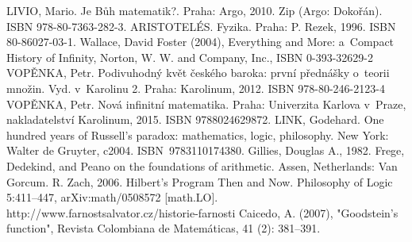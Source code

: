 \documentclass[czech]{article}
\begin{document}
\begin{thebibliography}{}

    LIVIO, Mario. Je Bůh matematik?. Praha: Argo, 2010. Zip (Argo: Dokořán). ISBN 978-80-7363-282-3.
    ARISTOTELÉS. Fyzika. Praha: P. Rezek, 1996. ISBN 80-86027-03-1.
    Wallace, David Foster (2004), Everything and More: a~Compact History of Infinity, Norton, W. W. and Company, Inc., ISBN 0-393-32629-2
    VOPĚNKA, Petr. Podivuhodný květ českého baroka: první přednášky o~teorii množin. Vyd. v~Karolinu 2. Praha: Karolinum, 2012. ISBN 978-80-246-2123-4
    VOPĚNKA, Petr. Nová infinitní matematika. Praha: Univerzita Karlova v~Praze, nakladatelství Karolinum, 2015. ISBN 9788024629872.    
    LINK, Godehard. One hundred years of Russell's paradox: mathematics, logic, philosophy. New York: Walter de Gruyter, c2004. ISBN~9783110174380.   
    Gillies, Douglas A., 1982. Frege, Dedekind, and Peano on the foundations of arithmetic. Assen, Netherlands: Van Gorcum.
    R. Zach, 2006. Hilbert's Program Then and Now. Philosophy of Logic 5:411–447, arXiv:math/0508572 [math.LO].
    http://www.farnostsalvator.cz/historie-farnosti
    Caicedo, A. (2007), "Goodstein's function", Revista Colombiana de Matemáticas, 41 (2): 381–391.

\end{thebibliography}
\end{document}
